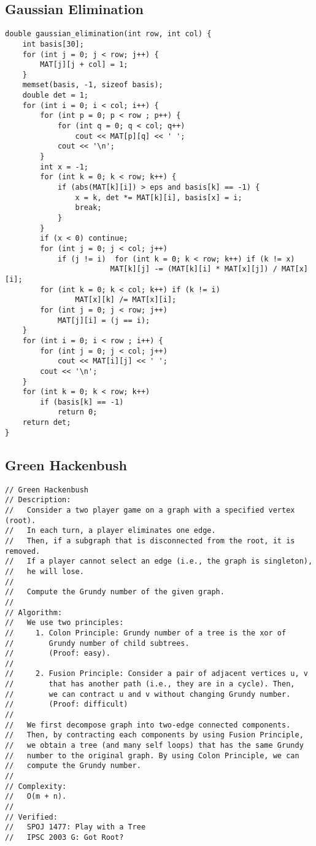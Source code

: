 \documentclass[FSZ,a4paper,onesided]{article}
\begin{document}
\begin{multicols*}{\COLS}
\subsection{Gaussian Elimination}
\begin{lstlisting}
double gaussian_elimination(int row, int col) {
    int basis[30];
    for (int j = 0; j < row; j++) {
        MAT[j][j + col] = 1;
    }
    memset(basis, -1, sizeof basis);
    double det = 1;
    for (int i = 0; i < col; i++) {
        for (int p = 0; p < row ; p++) {
            for (int q = 0; q < col; q++)
                cout << MAT[p][q] << ' ';
            cout << '\n';
        }
        int x = -1;
        for (int k = 0; k < row; k++) {
            if (abs(MAT[k][i]) > eps and basis[k] == -1) {
                x = k, det *= MAT[k][i], basis[x] = i;
                break;
            }
        }
        if (x < 0) continue;
        for (int j = 0; j < col; j++)
            if (j != i)  for (int k = 0; k < row; k++) if (k != x)
                        MAT[k][j] -= (MAT[k][i] * MAT[x][j]) / MAT[x][i];
        for (int k = 0; k < col; k++) if (k != i)
                MAT[x][k] /= MAT[x][i];
        for (int j = 0; j < row; j++)
            MAT[j][i] = (j == i);
    }
    for (int i = 0; i < row ; i++) {
        for (int j = 0; j < col; j++)
            cout << MAT[i][j] << ' ';
        cout << '\n';
    }
    for (int k = 0; k < row; k++)
        if (basis[k] == -1)
            return 0;
    return det;
}\end{lstlisting}
\subsection{Green Hackenbush}
\begin{lstlisting}
// Green Hackenbush
// Description:
//   Consider a two player game on a graph with a specified vertex (root).
//   In each turn, a player eliminates one edge.
//   Then, if a subgraph that is disconnected from the root, it is removed.
//   If a player cannot select an edge (i.e., the graph is singleton),
//   he will lose.
//
//   Compute the Grundy number of the given graph.
//
// Algorithm:
//   We use two principles:
//     1. Colon Principle: Grundy number of a tree is the xor of
//        Grundy number of child subtrees.
//        (Proof: easy).
//
//     2. Fusion Principle: Consider a pair of adjacent vertices u, v
//        that has another path (i.e., they are in a cycle). Then,
//        we can contract u and v without changing Grundy number.
//        (Proof: difficult)
//
//   We first decompose graph into two-edge connected components.
//   Then, by contracting each components by using Fusion Principle,
//   we obtain a tree (and many self loops) that has the same Grundy
//   number to the original graph. By using Colon Principle, we can
//   compute the Grundy number.
//
// Complexity:
//   O(m + n).
//
// Verified:
//   SPOJ 1477: Play with a Tree
//   IPSC 2003 G: Got Root?


\end{lstlisting}
\end{multicols*}
\end{document}
